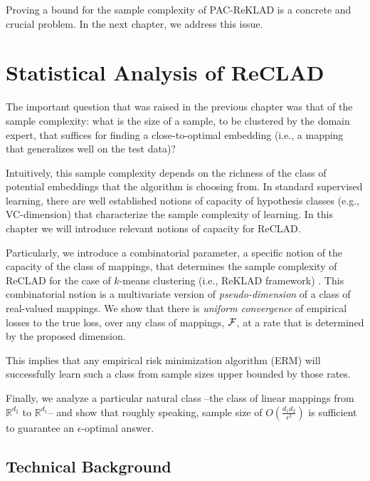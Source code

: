 \documentclass[letterpaper,12pt,titlepage,oneside,final]{book}
\begin{document}
Proving a bound for the sample complexity of PAC-ReKLAD is a concrete and crucial problem. In the next chapter, we address this issue.






\chapter{Statistical Analysis of ReCLAD}
\label{ANALYSIS}

The important question that was raised in the previous chapter was that of the sample complexity: what is the size of a sample, to be clustered by the domain expert, that suffices for finding a close-to-optimal embedding (i.e., a mapping that generalizes well on the test data)?

Intuitively, this sample complexity depends on the richness of the class of potential embeddings that the algorithm is choosing from. In standard supervised learning, there are well established notions of capacity of hypothesis classes (e.g., VC-dimension) that characterize the sample complexity of learning. In this chapter we will introduce relevant notions of capacity for ReCLAD.

Particularly, we introduce a combinatorial parameter, a specific notion of the capacity of the class of mappings, that determines the sample complexity of ReCLAD for the case of $k$-means clustering (i.e., ReKLAD framework) . This combinatorial notion is a multivariate version of \emph{pseudo-dimension} of a class of real-valued mappings. We show that there is \emph{uniform convergence} of empirical losses to the true loss, over any class of mappings, ${\cal F}$, at a rate that is determined by the proposed dimension. 

This implies that any empirical risk minimization algorithm (ERM) will successfully learn such a class from sample sizes upper bounded by those rates. 

Finally, we analyze a particular natural class --the class of linear mappings from $\mathbb{R}^{d_2}$ to $\mathbb{R}^{d_1}$--  and show that roughly speaking, sample size of $O(\frac{d_1d_2}{\epsilon^2})$ is sufficient to guarantee an $\epsilon$-optimal answer.


\section{Technical Background}
\end{document}
